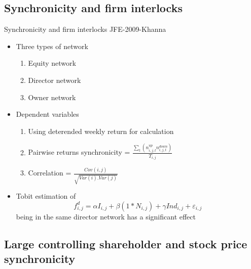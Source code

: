 \documentclass{beamer}
\begin{document}
	\subsection{Synchronicity and firm interlocks}
	\begin{frame}{Synchronicity and firm interlocks }{JFE-2009-Khanna} \label{ref1}
		\begin{itemize}
			\item Three types of network
			\begin{enumerate}
				\item Equity network \item Director network \item Owner network
			\end{enumerate}
			\item Dependent variables
			\begin{enumerate}
				\item[] Using deterended weekly return for calculation
				\item Pairwise returns synchronicity = $\frac{\sum_t (n^{up}_{i,j,t} 
					n^{down}_{i,j,t})}{T_{i,j}}$
				\item Correlation = $\frac{Cov(i,j)}{\sqrt{Var(i).Var(j)}}$
			\end{enumerate}
			\item Tobit estimation of
			\begin{equation*}
				f^d_{i,j} = \alpha I_{i,j} + \beta (1*N_{i,j}) + \gamma Ind_{i,j} + \varepsilon_{i,j}
			\end{equation*}
			being in the same director network has a significant effect
		\end{itemize}
	\end{frame}
	
	
	\subsection{Large controlling shareholder and stock price synchronicity}
	
\end{document}
